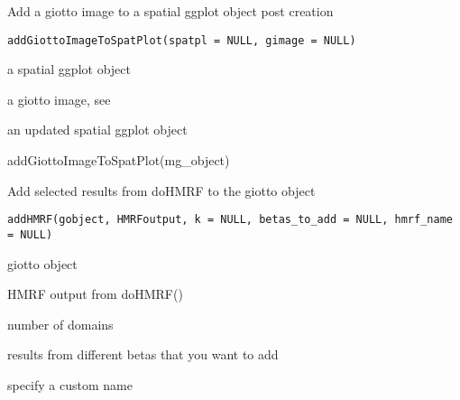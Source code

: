\documentclass[a4paper]{book}
\begin{document}
%
\begin{Description}\relax
Add a giotto image to a spatial ggplot object post creation
\end{Description}
%
\begin{Usage}
\begin{verbatim}
addGiottoImageToSpatPlot(spatpl = NULL, gimage = NULL)
\end{verbatim}
\end{Usage}
%
\begin{Arguments}
\begin{ldescription}
\item[\code{spatpl}] a spatial ggplot object

\item[\code{gimage}] a giotto image, see 
\end{ldescription}
\end{Arguments}
%
\begin{Value}
an updated spatial ggplot object
\end{Value}
%
\begin{Examples}
\begin{ExampleCode}
    addGiottoImageToSpatPlot(mg_object)
\end{ExampleCode}
\end{Examples}
%
\begin{Description}\relax
Add selected results from doHMRF to the giotto object
\end{Description}
%
\begin{Usage}
\begin{verbatim}
addHMRF(gobject, HMRFoutput, k = NULL, betas_to_add = NULL, hmrf_name = NULL)
\end{verbatim}
\end{Usage}
%
\begin{Arguments}
\begin{ldescription}
\item[\code{gobject}] giotto object

\item[\code{HMRFoutput}] HMRF output from doHMRF()

\item[\code{k}] number of domains

\item[\code{betas\_to\_add}] results from different betas that you want to add

\item[\code{name}] specify a custom name
\end{ldescription}
\end{Arguments}
\end{document}
